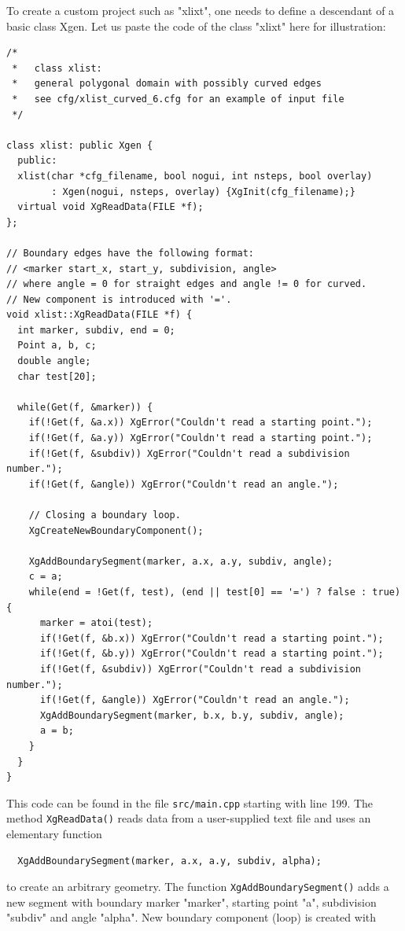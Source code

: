 \documentclass[12pt]{article}
\begin{document}
  To create a custom project such as "xlixt", one needs to define 
  a descendant of a basic class Xgen. Let us paste the 
  code of the class "xlixt" here for illustration: 

\begin{verbatim}
/*
 *   class xlist:
 *   general polygonal domain with possibly curved edges
 *   see cfg/xlist_curved_6.cfg for an example of input file
 */

class xlist: public Xgen {
  public:
  xlist(char *cfg_filename, bool nogui, int nsteps, bool overlay) 
        : Xgen(nogui, nsteps, overlay) {XgInit(cfg_filename);}
  virtual void XgReadData(FILE *f);
};

// Boundary edges have the following format:
// <marker start_x, start_y, subdivision, angle>
// where angle = 0 for straight edges and angle != 0 for curved.
// New component is introduced with '='.
void xlist::XgReadData(FILE *f) {
  int marker, subdiv, end = 0;
  Point a, b, c;
  double angle;
  char test[20];

  while(Get(f, &marker)) {
    if(!Get(f, &a.x)) XgError("Couldn't read a starting point.");
    if(!Get(f, &a.y)) XgError("Couldn't read a starting point.");
    if(!Get(f, &subdiv)) XgError("Couldn't read a subdivision number.");
    if(!Get(f, &angle)) XgError("Couldn't read an angle.");

    // Closing a boundary loop.
    XgCreateNewBoundaryComponent();

    XgAddBoundarySegment(marker, a.x, a.y, subdiv, angle);
    c = a;
    while(end = !Get(f, test), (end || test[0] == '=') ? false : true) {
      marker = atoi(test);
      if(!Get(f, &b.x)) XgError("Couldn't read a starting point.");
      if(!Get(f, &b.y)) XgError("Couldn't read a starting point.");
      if(!Get(f, &subdiv)) XgError("Couldn't read a subdivision number.");
      if(!Get(f, &angle)) XgError("Couldn't read an angle.");
      XgAddBoundarySegment(marker, b.x, b.y, subdiv, angle); 
      a = b;
    } 
  }
}
\end{verbatim}
This code can be found in the file {\tt src/main.cpp} starting 
with line 199. The method {\tt XgReadData()} reads data from 
a user-supplied text file and uses an elementary function 

\begin{verbatim}
  XgAddBoundarySegment(marker, a.x, a.y, subdiv, alpha);
\end{verbatim}
to create an arbitrary geometry. The function {\tt XgAddBoundarySegment()}
adds a new segment with boundary marker "marker", starting point "a", 
subdivision "subdiv" and angle "alpha". New boundary component (loop) is
created with
\end{document}
